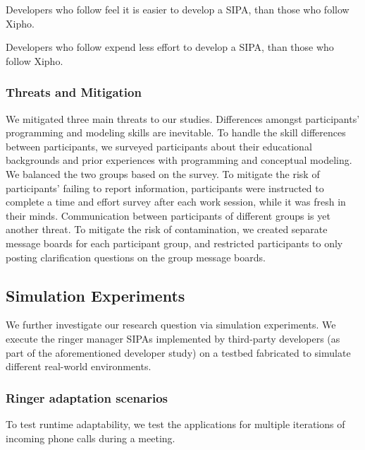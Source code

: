 \item Developers who follow \frameworkA feel it is easier to develop 
a SIPA, than those who follow Xipho.

\item Developers who follow \frameworkA expend less effort to develop 
a SIPA, than those who follow Xipho.

\ehypothesis

\subsubsection*{Threats and Mitigation}

We mitigated three main threats to our studies. Differences amongst
participants' programming and modeling skills are inevitable. To handle
the skill differences between participants, we surveyed participants
about their educational backgrounds and prior experiences with
programming and conceptual modeling. We balanced the two groups based on
the survey. To mitigate the risk of participants' failing to report information,
participants were instructed to complete a time and effort survey after
each work session, while it was fresh in their minds. Communication
between participants of different groups is yet another threat. To
mitigate the risk of contamination, we created separate message boards for each
participant group, and restricted participants to only posting
clarification questions on the group message boards.



\subsection{Simulation Experiments}
\label{sec:arnor-simulation}

We further investigate our research question via simulation experiments.
We execute the ringer manager SIPAs implemented by third-party
developers (as part of the aforementioned developer study) on a testbed
fabricated to simulate different real-world environments.


\subsubsection*{Ringer adaptation scenarios}

To test runtime adaptability, we test the applications for
multiple iterations of incoming phone calls during a meeting.

